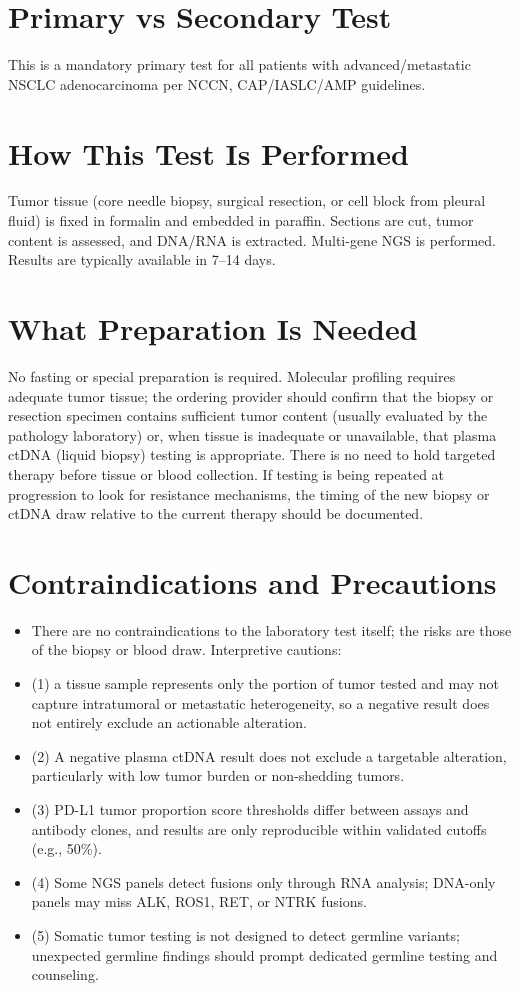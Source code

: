 \section*{Primary vs Secondary Test}
This is a mandatory primary test for all patients with advanced/metastatic NSCLC adenocarcinoma per NCCN, CAP/IASLC/AMP guidelines.

\section*{How This Test Is Performed}
Tumor tissue (core needle biopsy, surgical resection, or cell block from pleural fluid) is fixed in formalin and embedded in paraffin. Sections are cut, tumor content is assessed, and DNA/RNA is extracted. Multi-gene NGS is performed. Results are typically available in 7--14 days.

\section*{What Preparation Is Needed}
No fasting or special preparation is required. Molecular profiling requires adequate tumor tissue; the ordering provider should confirm that the biopsy or resection specimen contains sufficient tumor content (usually evaluated by the pathology laboratory) or, when tissue is inadequate or unavailable, that plasma ctDNA (liquid biopsy) testing is appropriate. There is no need to hold targeted therapy before tissue or blood collection. If testing is being repeated at progression to look for resistance mechanisms, the timing of the new biopsy or ctDNA draw relative to the current therapy should be documented.

\section*{Contraindications and Precautions}
\begin{itemize}
  \item There are no contraindications to the laboratory test itself; the risks are those of the biopsy or blood draw. Interpretive cautions:
  \item (1) a tissue sample represents only the portion of tumor tested and may not capture intratumoral or metastatic heterogeneity, so a negative result does not entirely exclude an actionable alteration.
  \item (2) A negative plasma ctDNA result does not exclude a targetable alteration, particularly with low tumor burden or non-shedding tumors.
  \item (3) PD-L1 tumor proportion score thresholds differ between assays and antibody clones, and results are only reproducible within validated cutoffs (e.g., 50\%).
  \item (4) Some NGS panels detect fusions only through RNA analysis; DNA-only panels may miss ALK, ROS1, RET, or NTRK fusions.
  \item (5) Somatic tumor testing is not designed to detect germline variants; unexpected germline findings should prompt dedicated germline testing and counseling.
\end{itemize}
